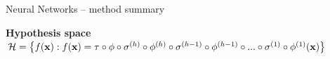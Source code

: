 \documentclass[11pt,compress,t,notes=noshow, xcolor=table]{beamer}
\newcommand{\highlight}[1]{\textcolor{hlcol}{\textbf{#1}}}
\begin{document}
\begin{frame2}{Neural Networks -- method summary}
   
  \highlight{Hypothesis space} ~~
  $\mathcal{H} = \left\{ f(\mathbf{x}): f(\mathbf{x}) = \tau \circ \phi \circ \sigma^{(h)} \circ
  \phi^{(h)} \circ \sigma^{(h - 1)} \circ \phi^{(h - 1)} \circ ... \circ 
  \sigma^{(1)} \circ \phi^{(1)} (\mathbf{x}) \right\}$
  
  
\end{frame2}
\end{document}
